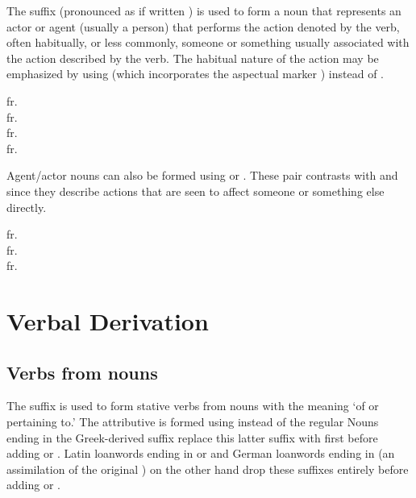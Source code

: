 The suffix  (pronounced as if written ) is used to form a noun that represents an actor or agent (usually a person) that performs the action denoted by the verb, often habitually, or less commonly, someone or something usually associated with the action described by the verb. The habitual nature of the action may be emphasized by using  (which incorporates the aspectual marker ) instead of . 

\ex
{} fr. \\
 fr. \\
 fr. \\
 fr. \\
\xe

Agent/actor nouns can also be formed using  or . These pair contrasts with  and  since they describe actions that are seen to affect someone or something else directly.

\ex
{} fr. \\
 fr. \\
 fr. 
\xe

\section{Verbal Derivation}

\subsection{Verbs from nouns}

The suffix  is used to form stative verbs from nouns with the meaning `of or pertaining to.' The attributive is formed using  instead of the regular  Nouns ending in the Greek-derived suffix  replace this latter suffix with  first before adding  or . Latin loanwords ending in  or  and German loanwords ending in  (an assimilation of the original ) on the other hand drop these suffixes entirely before adding  or .


